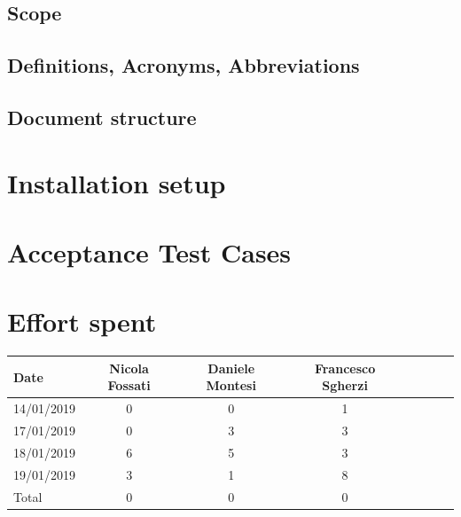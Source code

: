 \documentclass[a4paper,oneside,11pt]{article}
\begin{document}
        \subsection{Scope}
            
        \subsection{Definitions, Acronyms, Abbreviations}
            
            
        \subsection{Document structure}
        
\newpage
    \section{Installation setup}
    
     
     
    
\newpage

    \section{Acceptance Test Cases}

    
        
    \section{Effort spent}
        \begin{tabular}{l*{6}{c}r}
            Date & Nicola Fossati & Daniele Montesi & Francesco Sgherzi \\
            \hline
            14/01/2019 & 0 & 0 & 1   \\
            \hline
            17/01/2019 & 0 & 3 & 3   \\
            \hline
            18/01/2019 & 6 & 5 & 3   \\
            \hline
            19/01/2019 & 3 & 1 & 8   \\
            \hline
            Total & 0 & 0 & 0   \\
        \end{tabular}
\end{document}
